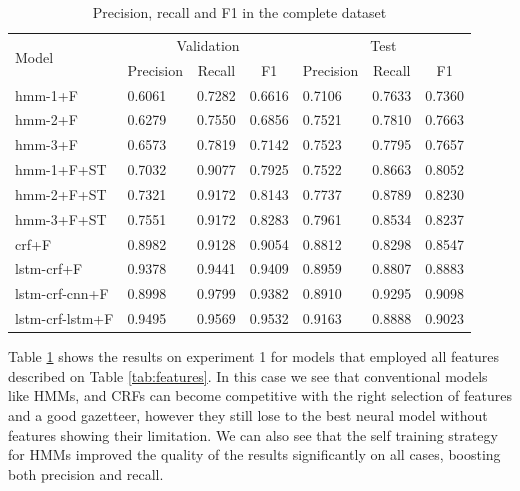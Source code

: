 \documentclass[sigconf]{acmart}
\begin{document}
\begin{table}[h]
  \small
  \begin{center}
    \begin{tabular}{ |l|l|l|l|l|l|l| }
      \hline
      \multirow{2}{*}{Model} & \multicolumn{3}{c|}{Validation} & \multicolumn{3}{c|}{Test} \\
                             & \multicolumn{1}{c}{Precision} & \multicolumn{1}{c}{Recall} & \multicolumn{1}{c|}{F1}
                             & \multicolumn{1}{c}{Precision} & \multicolumn{1}{c}{Recall} & \multicolumn{1}{c|}{F1} \\
      \hline
      hmm-1+F	      & 0.6061 & 0.7282 & 0.6616 & 0.7106 & 0.7633 & 0.7360 \\
      hmm-2+F	      & 0.6279 & 0.7550 & 0.6856 & 0.7521 & 0.7810 & 0.7663 \\
      hmm-3+F	      & 0.6573 & 0.7819 & 0.7142 & 0.7523 & 0.7795 & 0.7657 \\
      hmm-1+F+ST      & 0.7032 & 0.9077 & 0.7925 & 0.7522 & 0.8663 & 0.8052 \\
      hmm-2+F+ST      & 0.7321 & 0.9172 & 0.8143 & 0.7737 & 0.8789 & 0.8230 \\
      hmm-3+F+ST      & 0.7551 & 0.9172 & 0.8283 & 0.7961 & 0.8534 & 0.8237 \\
      crf+F	      & 0.8982 & 0.9128 & 0.9054 & 0.8812 & 0.8298 & 0.8547 \\
      lstm-crf+F      & 0.9378 & 0.9441 & 0.9409 & 0.8959 & 0.8807 & 0.8883 \\
      lstm-crf-cnn+F  & 0.8998 & 0.9799 & 0.9382 & 0.8910 & 0.9295 & 0.9098 \\
      lstm-crf-lstm+F & 0.9495 & 0.9569 & 0.9532 & 0.9163 & 0.8888 & 0.9023 \\
      \hline
    \end{tabular}
  \end{center}
  \caption{Precision, recall and F1 in the complete dataset}
  \label{tab:experiment1f}
\end{table}

Table \ref{tab:experiment1f} shows the results on experiment 1 for models
that employed all features described on Table \ref{tab:features}. In this case
we see that conventional models like HMMs, and CRFs can become competitive with
the right selection of features and a good gazetteer, however they still lose
to the best neural model without features showing their limitation. We can also
see that the self training strategy for HMMs improved the quality of the results
significantly on all cases, boosting both precision and recall.
\end{document}
